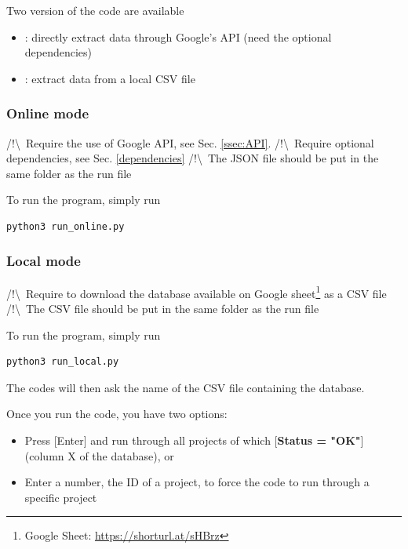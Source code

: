 Two version of the code are available
\begin{itemize}
    \item {}: directly extract data through Google's API (need the optional dependencies)
    \item {}: extract data from a local CSV file 
\end{itemize}

\begin{multicols}{2}
    \raggedcolumns
    \subsubsection*{Online mode}
    
        /!\textbackslash \ Require the use of Google API, see Sec. \ref{ssec:API}.\newline
        /!\textbackslash \ Require optional dependencies, see Sec. \ref{dependencies}\newline
        /!\textbackslash \ The JSON file should be put in the same folder as the run file
        
        To run the program, simply run
        \begin{lstlisting}[language=Python]
        python3 run_online.py\end{lstlisting}
    \columnbreak
    \subsubsection*{Local mode}
    
        /!\textbackslash \ Require to download the database available on Google sheet\footnote{Google Sheet: \href{https://docs.google.com/spreadsheets/d/1x_SdxdlHwG8chH77WqrTAAgijY2XBY3nPIi2p3TKqzs/edit?gid=1297224389\#gid=1297224389}{https://shorturl.at/sHBrz}} as a CSV file\newline
        \vspace{.5cm}
        /!\textbackslash \ The CSV file should be put in the same folder as the run file
    
        To run the program, simply run
        \begin{lstlisting}[language=Python]
        python3 run_local.py\end{lstlisting}
    
        The codes will then ask the name of the CSV file containing the database.
\end{multicols}

Once you run the code, you have two options:
\begin{itemize}
    \item Press [Enter] and run through all projects of which [\textbf{Status = "OK"}] (column X of the database), or
    \item Enter a number, the ID of a project, to force the code to run through a specific project
\end{itemize}

